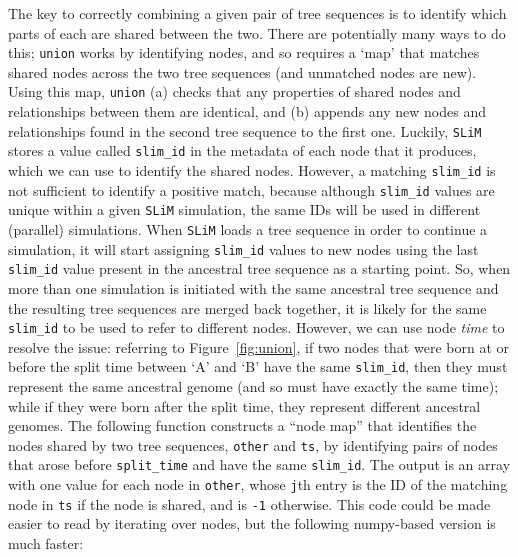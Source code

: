 \documentclass[12pt]{article}
\newcommand{\slim}[0]{\texttt{SLiM}\xspace}
\begin{document}
The key to correctly combining a given pair of tree sequences is to identify which parts of each are shared between the two.
There are potentially many ways to do this;
\verb|union| works by identifying nodes,
and so requires a `map' that matches shared nodes across the two tree sequences
(and unmatched nodes are new).
Using this map, \verb|union| (a) checks that any properties of shared nodes and relationships between them are identical, and
(b) appends any new nodes and relationships found in the second tree sequence to the first one.
Luckily, \slim stores a value called \verb|slim_id| in the metadata of each node that it produces,
which we can use to identify the shared nodes.
However, a matching \verb|slim_id| is not sufficient to identify a positive match,
because although \verb|slim_id| values are unique within a given \slim simulation,
the same IDs will be used in different (parallel) simulations.
When \slim loads a tree sequence in order to continue a simulation,
it will start assigning \verb|slim_id| values to new nodes using the last \verb|slim_id| value
present in the ancestral tree sequence as a starting point.
So, when more than one simulation is initiated with the same
ancestral tree sequence and the resulting tree sequences are merged back together, it is likely for the same \verb|slim_id| to be used to refer to different nodes.
However, we can use node \emph{time} to resolve the issue:
referring to Figure~\ref{fig:union}, if two nodes that were born at or before the split time between `A' and `B'
have the same \verb|slim_id|, then they must represent the same ancestral genome (and so must have exactly the same time);
while if they were born after the split time, they represent different ancestral genomes.
The following function constructs a ``node map'' that identifies the nodes shared by two tree sequences, \verb|other| and \verb|ts|,
by identifying pairs of nodes that arose before \verb|split_time| and have the same \verb|slim_id|.
The output is an array with one value for each node in \verb|other|,
whose \verb|j|th entry is the ID of the matching node in \verb|ts| if the node is shared,
and is \verb|-1| otherwise.
This code could be made easier to read by iterating over nodes,
but the following numpy-based version is much faster:
\end{document}

